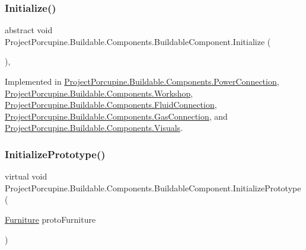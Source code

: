 \subsubsection{\texorpdfstring{Initialize()}{Initialize()}\hspace{0.1cm}{\footnotesize\ttfamily [2/2]}}
{\footnotesize\ttfamily abstract void Project\+Porcupine.\+Buildable.\+Components.\+Buildable\+Component.\+Initialize (\begin{DoxyParamCaption}{ }\end{DoxyParamCaption})\hspace{0.3cm}{\ttfamily [protected]}, {}}



Implemented in \hyperlink{class_project_porcupine_1_1_buildable_1_1_components_1_1_power_connection_a876abd5cb8ac85a2b9b4abae9e645418}{Project\+Porcupine.\+Buildable.\+Components.\+Power\+Connection}, \hyperlink{class_project_porcupine_1_1_buildable_1_1_components_1_1_workshop_af0f0f3e2aad78348bc8f68baddc119a2}{Project\+Porcupine.\+Buildable.\+Components.\+Workshop}, \hyperlink{class_project_porcupine_1_1_buildable_1_1_components_1_1_fluid_connection_ad5997d00cb9c0c341df24c021b499b05}{Project\+Porcupine.\+Buildable.\+Components.\+Fluid\+Connection}, \hyperlink{class_project_porcupine_1_1_buildable_1_1_components_1_1_gas_connection_a1eab83807e81517d9defd25ab97bf9a0}{Project\+Porcupine.\+Buildable.\+Components.\+Gas\+Connection}, and \hyperlink{class_project_porcupine_1_1_buildable_1_1_components_1_1_visuals_a9ddca8a9a68c0f79a7475025d3b08205}{Project\+Porcupine.\+Buildable.\+Components.\+Visuals}.

\mbox{\label{class_project_porcupine_1_1_buildable_1_1_components_1_1_buildable_component_a94210cf5d6a4ea1a90d6b54cd379836e}} 
\subsubsection{\texorpdfstring{Initialize\+Prototype()}{InitializePrototype()}}
{\footnotesize\ttfamily virtual void Project\+Porcupine.\+Buildable.\+Components.\+Buildable\+Component.\+Initialize\+Prototype (\begin{DoxyParamCaption}\item[{\hyperlink{class_furniture}{Furniture}}]{proto\+Furniture }\end{DoxyParamCaption})\hspace{0.3cm}{\ttfamily [virtual]}}



